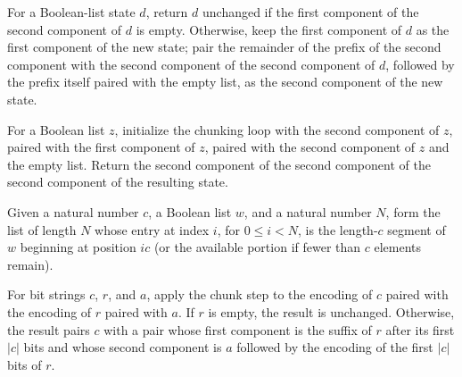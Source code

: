 \begin{definition}
\label{Complexity.BinArith.chunkStep}
\leanok
{}
For a Boolean-list state $d$, return $d$ unchanged if the first component of the second
component of $d$ is empty. Otherwise, keep the first component of $d$ as the first
component of the new state; pair the remainder of the prefix of the second component
with the second component of the second component of $d$, followed by the prefix itself
paired with the empty list, as the second component of the new state.
\end{definition}

\begin{definition}
\label{Complexity.BinArith.chunkW}
\leanok
{}
For a Boolean list $z$, initialize the chunking loop with the second component of $z$,
paired with the first component of $z$, paired with the second component of $z$ and the
empty list. Return the second component of the second component of the second component
of the resulting state.
\end{definition}

\begin{definition}
\label{Complexity.BinArith.chunkList}
\leanok
Given a natural number $c$, a Boolean list $w$, and a natural number $N$, form the list
of length $N$ whose entry at index $i$, for $0\le i<N$, is the length-$c$ segment of $w$
beginning at position $ic$ (or the available portion if fewer than $c$ elements remain).
\end{definition}

\begin{theorem}
\label{Complexity.BinArith.chunkStep_pairEncode}
\leanok
{}
For bit strings $c$, $r$, and $a$, apply the chunk step to the encoding of $c$ paired
with the encoding of $r$ paired with $a$. If $r$ is empty, the result is unchanged.
Otherwise, the result pairs $c$ with a pair whose first component is the suffix of $r$
after its first $|c|$ bits and whose second component is $a$ followed by the encoding of
the first $|c|$ bits of $r$.
\end{theorem}

